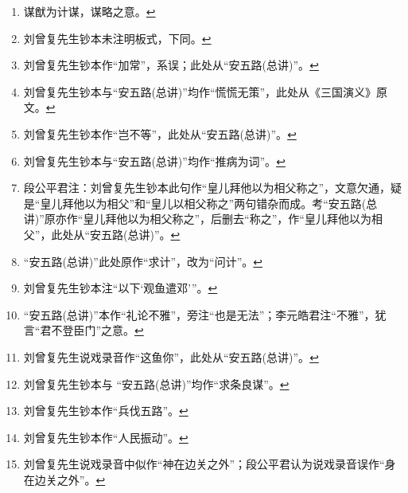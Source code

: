\begin{enumerate}
\item
  \leavevmode\hypertarget{fn244}{}%
  谋猷为计谋，谋略之意。\protect\hyperlink{fnref244}{↩}
\item
  \leavevmode\hypertarget{fn245}{}%
  刘曾复先生钞本未注明板式，下同。\protect\hyperlink{fnref245}{↩}
\item
  \leavevmode\hypertarget{fn246}{}%
  刘曾复先生钞本作``加常''，系误；此处从``安五路(总讲)''。\protect\hyperlink{fnref246}{↩}
\item
  \leavevmode\hypertarget{fn247}{}%
  刘曾复先生钞本与``安五路(总讲)''均作``慌慌无策''，此处从《三国演义》原文。\protect\hyperlink{fnref247}{↩}
\item
  \leavevmode\hypertarget{fn248}{}%
  刘曾复先生钞本作``岂不等''，此处从``安五路(总讲)''。\protect\hyperlink{fnref248}{↩}
\item
  \leavevmode\hypertarget{fn249}{}%
  刘曾复先生钞本与``安五路(总讲)''均作``推病为词''。\protect\hyperlink{fnref249}{↩}
\item
  \leavevmode\hypertarget{fn250}{}%
  段公平君注：刘曾复先生钞本此句作``皇儿拜他以为相父称之''，文意欠通，疑是``皇儿拜他以为相父''和``皇儿以相父称之''两句错杂而成。考``安五路(总讲)''原亦作``皇儿拜他以为相父称之''，后删去``称之''，作``皇儿拜他以为相父''，此处从``安五路(总讲)''。\protect\hyperlink{fnref250}{↩}
\item
  \leavevmode\hypertarget{fn251}{}%
  ``安五路(总讲)''此处原作``求计''，改为``问计''。\protect\hyperlink{fnref251}{↩}
\item
  \leavevmode\hypertarget{fn252}{}%
  刘曾复先生钞本注``以下`观鱼遣邓'''。\protect\hyperlink{fnref252}{↩}
\item
  \leavevmode\hypertarget{fn253}{}%
  ``安五路(总讲)''本作``礼论不雅''，旁注``也是无法''；李元皓君注``不雅''，犹言``君不登臣门''之意。\protect\hyperlink{fnref253}{↩}
\item
  \leavevmode\hypertarget{fn254}{}%
  刘曾复先生说戏录音作``这鱼你''，此处从``安五路(总讲)''。\protect\hyperlink{fnref254}{↩}
\item
  \leavevmode\hypertarget{fn255}{}%
  刘曾复先生钞本与
  ``安五路(总讲)''均作``求条良谋''。\protect\hyperlink{fnref255}{↩}
\item
  \leavevmode\hypertarget{fn256}{}%
  刘曾复先生钞本作``兵伐五路''。\protect\hyperlink{fnref256}{↩}
\item
  \leavevmode\hypertarget{fn257}{}%
  刘曾复先生钞本作``人民振动''。\protect\hyperlink{fnref257}{↩}
\item
  \leavevmode\hypertarget{fn258}{}%
  刘曾复先生说戏录音中似作``神在边关之外''；段公平君认为说戏录音误作``身在边关之外''。\protect\hyperlink{fnref258}{↩}

\end{enumerate}
